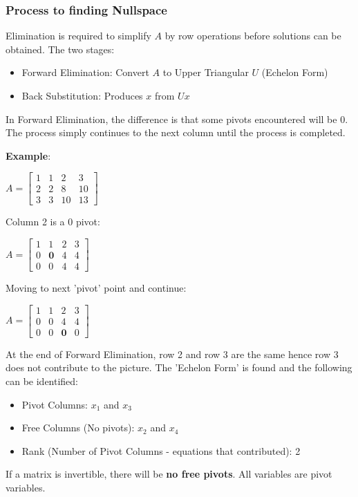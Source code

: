 \documentclass[10pt,a4paper]{article}
\begin{document}
\subsubsection{Process to finding Nullspace}
Elimination is required to simplify $A$ by row operations before solutions can be obtained. The two
stages:
\begin{itemize}
	\item Forward Elimination: Convert $A$ to Upper Triangular $U$ (Echelon Form)
	\item Back Substitution: Produces $x$ from $Ux$
\end{itemize}
In Forward Elimination, the difference is that some pivots encountered will be 0. The process simply continues to the next column until
the process is completed. \par 
\textbf{Example}:
\begin{center}
	$A=\begin{bmatrix}
		1&1&2&3 \\ 
		2&2&8&10 \\
		3&3&10&13
	\end{bmatrix}$ \par 
\end{center}
Column 2 is a 0 pivot:
\begin{center}
	$A=\begin{bmatrix}
		1&1&2&3 \\ 
		0&\textbf{0}&4&4 \\
		0&0&4&4
	\end{bmatrix}$
\end{center}
Moving to next 'pivot' point and continue: 
\begin{center}
	$A=\begin{bmatrix}
		1&1&2&3 \\ 
		0&0&4&4 \\
		0&0&\textbf{0}&0
	\end{bmatrix}$
\end{center}
At the end of Forward Elimination, row 2 and row 3 are the same hence row 3 does not contribute to
the picture. The 'Echelon Form' is found and the following can be identified:
\begin{itemize}
	\item Pivot Columns: $x_1$ and $x_3$
	\item Free Columns (No pivots): $x_2$ and $x_4$
	\item Rank (Number of Pivot Columns - equations that contributed): 2
\end{itemize}
\begin{tcolorbox}[breakable,colback=white,colframe=black,width=\dimexpr\textwidth+12mm\relax,enlarge left by=-6mm]
	If a matrix is invertible, there will be \textbf{no free pivots}. All variables are pivot variables.
\end{tcolorbox}
\end{document}
